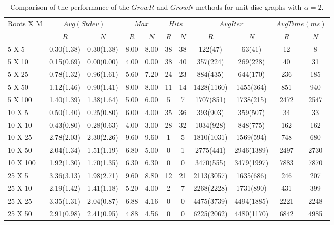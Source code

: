 \begin{table*}[htb]
\footnotesize
\center
\caption{\label{table:Alpha2}
Comparison of the performance of the $GrowR$ and $GrowN$ methods for  unit disc graphs with $\alpha = 2$.}
\begin{tabularx}{430pt}{X*{10}{c}}

\toprule
Roots X M&  \multicolumn{2}{c}{$Avg(Stdev)$}  & \multicolumn{2}{c}{$Max$} & \multicolumn{2}{c}{$Hits$}& \multicolumn{2}{c}{$Avg Iter$}& \multicolumn{2}{c}{$Avg Time(ms)$}\\

& $R$ & $N$  &  $R$ & $N$ &  $R$ & $N$& $R$ & $N$&  $R$ & $N$\\

\midrule
5 X 5 & 0.30(1.38) & 0.30(1.38) & 8.00 & 8.00 & 38 & 38 & 122(47) & 63(41) & 12 & 8 \\
5 X 10 & 0.15(0.69) & 0.00(0.00) & 4.00 & 0.00 & 38 & 40 & 357(224) & 269(228) & 40 & 31 \\
5 X 25 & 0.78(1.32) & 0.96(1.61) & 5.60 & 7.20 & 24 & 23 & 884(435) & 644(170) & 236 & 185 \\
5 X 50 & 1.12(1.46) & 0.90(1.41) & 8.00 & 8.00 & 11 & 14 & 1428(1160) & 1455(364) & 851 & 940 \\
5 X 100 & 1.40(1.39) & 1.38(1.64) & 5.00 & 6.00 & 5 & 7 & 1707(851) & 1738(215) & 2472 & 2547 \\
\midrule
10 X 5 & 0.50(1.40) & 0.25(0.80) & 6.00 & 4.00 & 35 & 36 & 393(903) & 359(507) & 34 & 33 \\
10 X 10 & 0.43(0.80) & 0.28(0.63) & 4.00 & 3.00 & 28 & 32 & 1034(928) & 848(775) & 162 & 162 \\
10 X 25 & 2.78(2.03) & 2.30(2.26) & 9.60 & 9.60 & 1 & 5 & 1810(1031) & 1569(594) & 748 & 680 \\
10 X 50 & 2.04(1.34) & 1.51(1.19) & 6.80 & 5.00 & 0 & 1 & 2775(441) & 2946(1389) & 2497 & 2730 \\
10 X 100 & 1.92(1.30) & 1.70(1.35) & 6.30 & 6.30 & 0 & 0 & 3470(555) & 3479(1997) & 7883 & 7870 \\
\midrule
25 X 5 & 3.36(3.13) & 1.98(2.71) & 9.60 & 8.80 & 12 & 21 & 2113(3057) & 1635(686) & 246 & 207 \\
25 X 10 & 2.19(1.42) & 1.41(1.18) & 5.20 & 4.00 & 2 & 7 & 2268(2228) & 1731(890) & 431 & 399 \\
25 X 25 & 3.35(1.31) & 2.04(0.87) & 6.88 & 4.16 & 0 & 0 & 4475(3739) & 4494(1885) & 2221 & 2248 \\
25 X 50 & 2.91(0.98) & 2.41(0.95) & 4.88 & 4.56 & 0 & 0 & 6225(2062) & 4480(1170) & 6842 & 4985 \\

\end{tabularx}
\end{table*}
